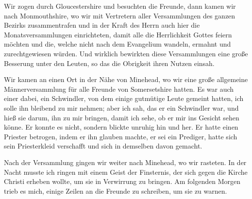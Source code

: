 Wir zogen durch Gloucestershire und besuchten die Freunde,
dann kamen wir nach Monmouthshire, wo wir mit Vertretern
aller Versammlungen des ganzen Bezirks zusammentrafen und in
der Kraft des Herrn auch hier die Monatsversammlungen 
einrichteten, damit alle die Herrlichkeit Gottes feiern möchten und
die, welche nicht nach dem Evangelium wandeln, ermahnt und
zurechtgewiesen würden. Und wirklich bewirkten diese 
Versammlungen eine große Besserung unter den Leuten, so das die 
Obrigkeit ihren Nutzen einsah.

Wir kamen an einen Ort in der Nähe von Minehead, wo
wir eine große allgemeine Männerversammlung für alle Freunde
von Somersetshire hatten. Es war auch einer dabei, ein
Schwindler, von dem einige gutmütige Leute gemeint hatten, ich
solle ihn bleibend zu mir nehmen; aber ich sah, das er ein
Schwindler war, und hieß sie darum, ihn zu mir bringen, damit
ich sehe, ob er mir ins Gesicht sehen könne. Er konnte es
nicht, sondern blickte unruhig hin und her. Er hatte einen
Priester betrogen, indem er ihn glauben machte, er sei ein 
Prediger, hatte sich sein Priesterkleid verschafft und sich in demselben
davon gemacht.

Nach der Versammlung gingen wir weiter nach Minehead,
wo wir rasteten. In der Nacht musste ich ringen mit einem
Geist der Finsternis, der sich gegen die Kirche Christi erheben
wollte, um sie in Verwirrung zu bringen. Am folgenden Morgen
trieb es mich, einige Zeilen an die Freunde zu schreiben, um sie
zu warnen.


